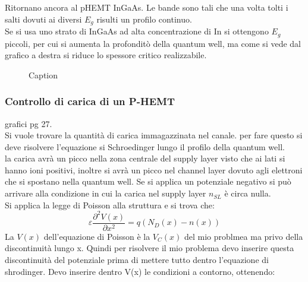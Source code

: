 \begin{exbox}
Ritornano ancora al pHEMT InGaAs. Le bande sono tali che una volta tolti i salti dovuti ai diversi $E_g$ risulti un profilo continuo.\\
Se si usa uno strato di InGaAs ad alta concentrazione di In si ottengono $E_g$ piccoli, per cui si aumenta la profonditò della quantum well, ma come si vede dal grafico a destra si riduce lo spessore critico realizzabile.
\end{exbox}
\begin{figure}[hbt!]
    \centering
    \caption{Caption}%
    \label{fig:enter-label}
\end{figure}
\subsubsection{Controllo di carica di un P-HEMT}
grafici pg 27.\\
Si vuole trovare la quantità di carica immagazzinata nel canale. per fare questo si deve risolvere l'equazione si Schroedinger lungo il profilo della quantum well.\\
la carica avrà un picco nella zona centrale del supply layer visto che ai lati si hanno ioni positivi, inoltre si avrà un picco nel channel layer dovuto agli elettroni che si spostano nella quantum well. Se si applica un potenziale negativo si può arrivare alla condizione in cui la carica nel supply layer $n_{SL}$ è circa nulla.\\
Si applica la legge di Poisson alla struttura e si trova che:
\begin{equation}
    \varepsilon \dfrac{\partial^2V(x)}{\partial x^2}=q(N_D(x)-n(x))
\end{equation}
La $V(x)$ dell'equazione di Poisson è la $V_C(x)$ del mio problmea ma privo della discontinuità lungo x. Quindi per risolvere il mio problema devo inserire questa discontinuità del potenziale prima di mettere tutto dentro l'equazione di shrodinger. Devo inserire dentro V(x) le condizioni a contorno, ottenendo:

